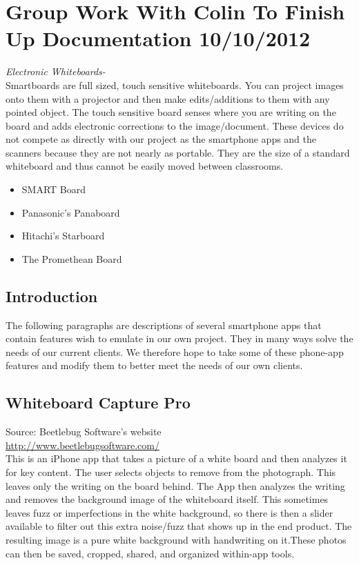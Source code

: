 \documentclass[]{article}
\begin{document}
	\section{Group Work With Colin To Finish Up Documentation 10/10/2012}
		\noindent \emph{Electronic Whiteboards-} \\
Smartboards are full sized, touch sensitive whiteboards. You can project images onto them with a projector and then make edits/additions to them with any pointed object. The touch sensitive board senses where you are writing on the board and adds electronic corrections to the image/document. These devices do not compete as directly with our project as the smartphone apps and the scanners because they are not nearly as portable. They are the size of a standard whiteboard and thus cannot be easily moved between classrooms.
            \begin{itemize}
                \item SMART Board
                \item Panasonic's Panaboard
                \item Hitachi's Starboard
                \item The Promethean Board
            \end{itemize}
			

			\subsection{Introduction}
The following paragraphs are descriptions of several smartphone apps that contain features wish to emulate in our own project. They in many ways solve the needs of our current clients. We therefore hope to take some of these phone-app features and modify them to better meet the needs of our own clients. \\
				\subsection*{Whiteboard Capture Pro}
Source: Beetlebug Software's website\\
{\color{red} \url{http://www.beetlebugsoftware.com/}} \\
					
This is an iPhone app that takes a picture of a white board and then analyzes it for key content. The user selects objects to remove from the photograph. This leaves only the writing on the board behind. The App then analyzes the writing and removes the background image of the whiteboard itself. This sometimes leaves fuzz or imperfections in the white background, so there is then a slider available to filter out this extra noise/fuzz that shows up in the end product. The resulting image is a pure white background with handwriting on it.These photos can then be saved, cropped, shared, and organized within-app tools. \\
\end{document}
